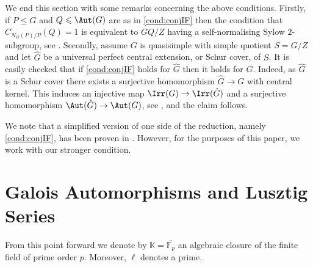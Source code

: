 \documentclass[eqthmnum, nocolour]{jt-calcs}
\begin{document}
\begin{pa}\label{pa:conditions-remarks}
We end this section with some remarks concerning the above conditions. Firstly, if $P \leqslant G$ and $Q \leqslant \Aut(G)$ are as in \cref{cond:conjIF} then the condition that $C_{N_G(P)/P}(Q)=1$ is equivalent to $GQ/Z$ having a self-normalising Sylow $2$-subgroup, see \cite[Lemma 2.1(ii)]{navarro-tiep-turull:2007:p-rational-characters}. Secondly, assume $G$ is quasisimple with simple quotient $S = G/Z$ and let $\hat{G}$ be a universal perfect central extension, or Schur cover, of $S$. It is easily checked that if \cref{cond:conjIF} holds for $\hat{G}$ then it holds for $G$. Indeed, as $\hat{G}$ is a Schur cover there exists a surjective homomorphism $\hat{G} \to G$ with central kernel. This induces an injective map $\Irr(G) \to \Irr(\hat{G})$ and a surjective homomorphism $\Aut(\hat{G}) \to \Aut(G)$, see \cite[Corollary 5.1.4(a)]{gorenstein-lyons-solomon:1998:classification-3}, and the claim follows.
\end{pa}

\begin{rem}
We note that a simplified version of one side of the reduction, namely \cref{cond:conjIF}, has been proven in \cite{navarro-tiep:2015:irreducible-representations-of-odd-degree}. However, for the purposes of this paper, we work with our stronger condition.
\end{rem}

\section{Galois Automorphisms and Lusztig Series}\label{sec:lusztig-series}
\begin{assumption}
From this point forward we denote by $\mathbb{K} = \overline{\mathbb{F}_p}$ an algebraic closure of the finite field of prime order $p$. Moreover, $\ell$ denotes a prime.
\end{assumption}
\end{document}
